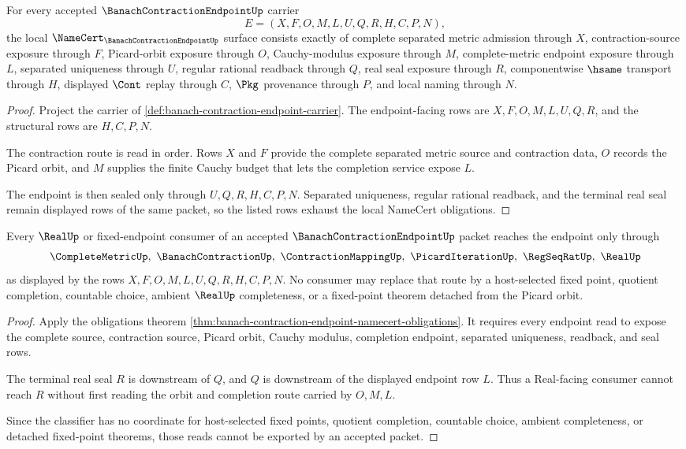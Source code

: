 \begin{theorem}
\label{thm:banach-contraction-endpoint-namecert-obligations}
For every accepted $\BanachContractionEndpointUp$ carrier
$$
E=(X,F,O,M,L,U,Q,R,H,C,P,N),
$$
the local $\NameCert_{\BanachContractionEndpointUp}$ surface consists exactly of complete separated metric admission through $X$, contraction-source exposure through $F$, Picard-orbit exposure through $O$, Cauchy-modulus exposure through $M$, complete-metric endpoint exposure through $L$, separated uniqueness through $U$, regular rational readback through $Q$, real seal exposure through $R$, componentwise $\hsame$ transport through $H$, displayed $\Cont$ replay through $C$, $\Pkg$ provenance through $P$, and local naming through $N$.
\end{theorem}
\begin{proof}
Project the carrier of \autoref{def:banach-contraction-endpoint-carrier}. The endpoint-facing rows are $X,F,O,M,L,U,Q,R$, and the structural rows are $H,C,P,N$.

The contraction route is read in order. Rows $X$ and $F$ provide the complete separated metric source and contraction data, $O$ records the Picard orbit, and $M$ supplies the finite Cauchy budget that lets the completion service expose $L$.

The endpoint is then sealed only through $U,Q,R,H,C,P,N$. Separated uniqueness, regular rational readback, and the terminal real seal remain displayed rows of the same packet, so the listed rows exhaust the local NameCert obligations.
\end{proof}

\begin{theorem}
\label{thm:banach-contraction-endpoint-nonescape}
Every $\RealUp$ or fixed-endpoint consumer of an accepted $\BanachContractionEndpointUp$ packet reaches the endpoint only through
$$
\CompleteMetricUp,\ \BanachContractionUp,\ \ContractionMappingUp,\ \PicardIterationUp,\ \RegSeqRatUp,\ \RealUp
$$
as displayed by the rows $X,F,O,M,L,U,Q,R,H,C,P,N$. No consumer may replace that route by a host-selected fixed point, quotient completion, countable choice, ambient $\RealUp$ completeness, or a fixed-point theorem detached from the Picard orbit.
\end{theorem}
\begin{proof}
Apply the obligations theorem \autoref{thm:banach-contraction-endpoint-namecert-obligations}. It requires every endpoint read to expose the complete source, contraction source, Picard orbit, Cauchy modulus, completion endpoint, separated uniqueness, readback, and seal rows.

The terminal real seal $R$ is downstream of $Q$, and $Q$ is downstream of the displayed endpoint row $L$. Thus a Real-facing consumer cannot reach $R$ without first reading the orbit and completion route carried by $O,M,L$.

Since the classifier has no coordinate for host-selected fixed points, quotient completion, countable choice, ambient completeness, or detached fixed-point theorems, those reads cannot be exported by an accepted packet.
\end{proof}

